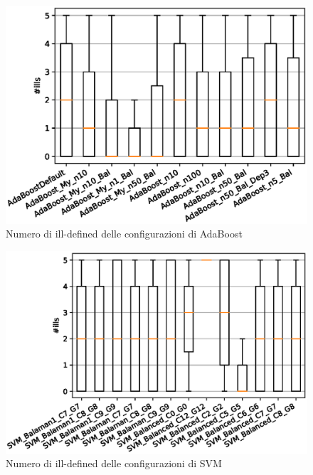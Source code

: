 \documentclass[12pt,a4paper,oneside,hidelinks]{report}
\begin{document}

\vspace*{\fill}

\begin{figure}[p]%
    \centering
    \includegraphics[scale = 0.80]{CC-AdaBoost-ills.eps}%
    \caption{Numero di ill-defined delle configurazioni di AdaBoost}%
    \label{figure:ill1}%
\end{figure}

\begin{figure}[hb]%
    \centering
    \includegraphics[scale = 0.80]{CC-SVM-ills.eps}%
    \caption{Numero di ill-defined delle configurazioni di SVM}%
    \label{figure:ill12}%
\end{figure}

\vspace*{\fill}
\end{document}
